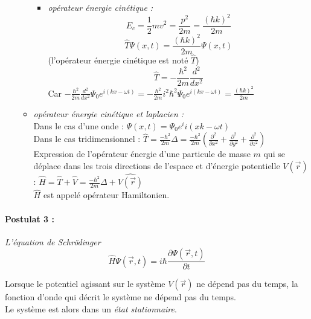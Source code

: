 \documentclass[../main.tex]{subfile}
\begin{document}
\begin{itemize}
\begin{itemize}
\begin{ex}
\begin{itemize}
                     \item \emph{opérateur énergie cinétique :} \\
                        $$E_c = \frac{1}{2} mv^2 = \frac{p^2}{2m} = \frac{(\hbar k)^2}{2m}$$
                        $$\hat{T} \Psi(x, t) = \frac{(\hbar k)^2}{2m} \Psi(x, t)$$
                        (l'opérateur énergie cinétique est noté $\hat{T}$)
                        $$\hat{T} = -\frac{\hbar^2}{2m} \frac{d^2}{dx^2}$$ 
                        Car $-\frac{\hbar^2}{2m} \frac{d^2}{dx^2}\Psi_0 e^{i(kx - \omega t)} = -\frac{\hbar^2}{2m}i^2\hbar^2 \Psi_0 e^{i(kx - \omega t)} = \frac{(\hbar k)^2}{2m}$
               \end{itemize}
            \end{ex}
         \item \emph{opérateur énergie cinétique et laplacien :}\\
            Dans le cas d'une onde : $\Psi(x, t) = \Psi_0 e^i{i(xk-\omega t)}$\\

            Dans le cas tridimensionnel :
            $\hat{T} = \frac{-\hbar^2}{2m} \Delta = \frac{-\hbar^2}{2m} (\frac{\partial^2}{\partial x^2} + \frac{\partial^2}{\partial y^2} + \frac{\partial^2}{\partial z^2})$\\

            Expression de l'opérateur énergie d'une particule de masse $m$ qui se déplace dans les trois directions de l'espace et d'énergie potentielle $V(\vec{r})$ :
            $\hat{H} = \hat{T} + \hat{V} = \frac{-\hbar^2}{2m} \Delta + \hat{V(\vec{r})}$\\

            $\hat{H}$ est appelé opérateur Hamiltonien.\\
      \end{itemize}
\end{itemize}

\paragraph{Postulat 3 :} \emph{L'équation de Schrödinger}\\

$$\hat{H} \Psi(\vec{r}, t) = i \hbar \frac{\partial \Psi(\vec{r}, t)}{\partial t}$$

   Lorsque le potentiel agissant sur le système $V(\vec{r})$ ne dépend pas du temps, la fonction d'onde qui décrit le système ne dépend pas du temps.\\
   Le système est alors dans un \emph{état stationnaire}.\\
\end{document}
